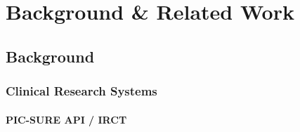 \chapter{Background \& Related Work}

\section{Background}

\subsection{Clinical Research Systems}









\subsubsection{PIC-SURE API / IRCT}


